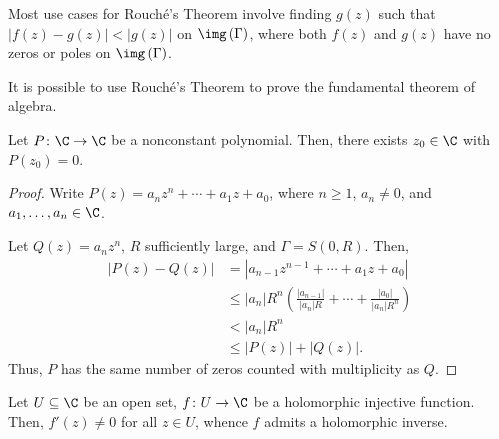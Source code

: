 \documentclass[10pt]{mypackage}
\begin{document}
\begin{remark}
  Most use cases for Rouché's Theorem involve finding $g(z)$ such that $\left\vert f(z) - g(z)\right\vert < \left\vert g(z) \right\vert$ on $\img\left( \Gamma \right)$, where both $f(z)$ and $g(z)$ have no zeros or poles on $\img\left( \Gamma \right)$.
\end{remark}
It is possible to use Rouché's Theorem to prove the fundamental theorem of algebra.
\begin{corollary}
  Let $P\colon \C\rightarrow \C$ be a nonconstant polynomial. Then, there exists $z_0\in \C$ with $P\left( z_0 \right) = 0$.
\end{corollary}
\begin{proof}
  Write $P(z) = a_nz^{n} + \cdots + a_1 z + a_0$, where $n\geq 1$, $a_n\neq 0$, and $a_1,\dots,a_n\in \C$.%

  Let $Q(z) = a_nz^{n}$, $R$ sufficiently large, and $\Gamma = S\left( 0,R \right)$. Then,
  \begin{align*}
    \left\vert P(z) - Q(z) \right\vert &= \left\vert a_{n-1}z^{n-1} + \cdots + a_1 z + a_0 \right\vert\\
                                       &\leq \left\vert a_n \right\vert R^{n} \left( \frac{\left\vert a_{n-1} \right\vert}{\left\vert a_n \right\vert R} + \cdots + \frac{\left\vert a_0 \right\vert}{\left\vert a_n \right\vert R^{n}} \right)\\
                                       &< \left\vert a_n \right\vert R^{n}\\
                                       &\leq \left\vert P(z) \right\vert + \left\vert Q(z) \right\vert.
  \end{align*}
  Thus, $P$ has the same number of zeros counted with multiplicity as $Q$.
\end{proof}
\begin{corollary}
  Let $U\subseteq \C$ be an open set, $f\colon U\rightarrow \C$ be a holomorphic injective function. Then, $f'(z)\neq 0$ for all $z\in U$, whence $f$ admits a holomorphic inverse.
\end{corollary}
\end{document}
